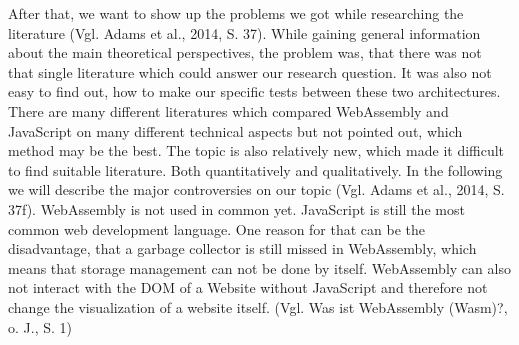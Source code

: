 After that, we want to show up the problems we got while researching the literature (Vgl. Adams et al., 2014, S. 37). While gaining general information about the main theoretical perspectives, the problem was, that there was not that single literature which could answer our research question. It was also not easy to find out, how to make our specific tests between these two architectures. There are many different literatures which compared WebAssembly and JavaScript on many different technical aspects but not pointed out, which method may be the best. The topic is also relatively new, which made it difficult to find suitable literature. Both quantitatively and qualitatively.
In the following we will describe the major controversies on our topic (Vgl. Adams et al., 2014, S. 37f). WebAssembly is not used in common yet. JavaScript is still the most common web development language. One reason for that can be the disadvantage, that a garbage collector is still missed in WebAssembly, which means that storage management can not be done by itself. WebAssembly can also not interact with the DOM of a Website without JavaScript and therefore not change the visualization of a website itself. (Vgl. Was ist WebAssembly (Wasm)?, o. J., S. 1)
